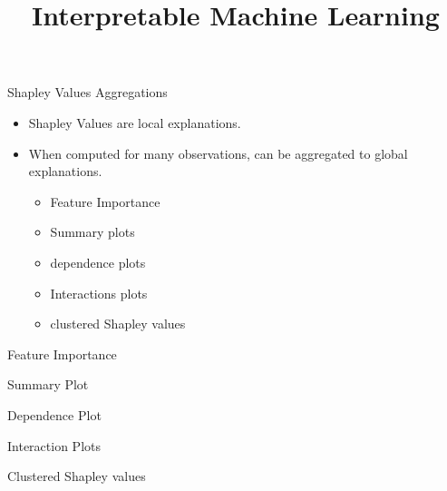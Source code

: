 \documentclass[11pt,compress,t,notes=noshow, aspectratio=169, xcolor=table]{beamer}
\title{Interpretable Machine Learning}
\date{}
\begin{document}
\newcommand{\learninggoals}{
\item Understand structure of tabular data in ML
\item Understand difference between target and features
\item Understand difference between labeled and unlabeled data
\item Know concept of data-generating process}


\begin{vbframe}{Shapley Values Aggregations}

  \begin{itemize}
    \item Shapley Values are local explanations.
    \item When computed for many observations, can be aggregated to global explanations.
      \begin{itemize}
        \item Feature Importance
        \item Summary plots
        \item dependence plots
        \item Interactions plots
        \item clustered Shapley values
      \end{itemize}
  \end{itemize}
\end{vbframe}

\begin{vbframe}{Feature Importance}
\end{vbframe}

\begin{vbframe}{Summary Plot}
\end{vbframe}

\begin{vbframe}{Dependence Plot}
\end{vbframe}

\begin{vbframe}{Interaction Plots}
\end{vbframe}

\begin{vbframe}{Clustered Shapley values}
\end{vbframe}





\endlecture
\end{document}
